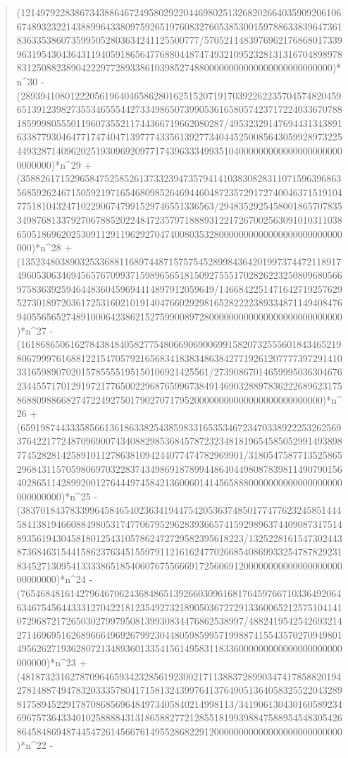 \documentclass[11pt,a4paper]{article}
\theoremstyle{plain}
\theoremstyle{definition}
\begin{document}
\begin{quote}
(121497922838673438864672495802922044698025132682026640359092061066748932322143889964338097592651976083276053853001597886338396473618363353860735995052803634241125500777/57052114839769621768680173399631954304364311940591865647768804487474932109523281313167048989788312508823890422297728933861039852748800000000000000000000000000)*n\^{}30 - (28939410801222056196404658628016251520719170392262235704574820459651391239827355346555442733498650739905361658057423717224033670788185999805550119607355211744366719662080287/495323291476944313438916338779304647717474047139777433561392773404452500856430599289732254493287140962025193096920977174396333499351040000000000000000000000000000)*n\^{}29 + (358826171529658475258526137332394735794141038308283110715963968635685926246715059219716546809852646944604872357291727400463715191047751810432471022906747991529746551336563/2948352925458001865707835349876813379270678852022484723579718889312217267002563091010311038650518696202530911291196292704740080353280000000000000000000000000000)*n\^{}28 + (135234803890325336881168974487157575452899843642019973744721189174960530634694565767099371598965651815092755517028262232508096805669758363925946448360459694414897912059649/1466842251471642719257629527301897203617253160210191404766029298165282222389334871149408476940556565274891000642386215275990089728000000000000000000000000000)*n\^{}27 - (16186865061627843848405827754806690690069915820732555601843465219806799976168812215470579216568341838348638427719261207777397291410331659890702015785555195150106921425561/2739086701465999503630467623445571701291972177650022968765996738491469032889783622268962317586880988668274722492750179027071795200000000000000000000000000)*n\^{}26 + (659198744333585661361863382543859833165353467234703389222532625693764221772487096900743408829853684578723234818196545850529914938987745282814258910112786381094244077474782969901/3180547587713525865296843115705980697032283743498691878994486404498087839811490790156402865114289920012764449745842136006014145658880000000000000000000000000000)*n\^{}25 - (383701843783399645846540236341944754205363748501774776232458514445841381946608849805317477067952962839366574159298963744090873175148935619430458180125431057862472729582395618223/132522816154730244387368463154415862376345155979112161624770266854086993325478782923183452713095413333865185406076755666917256069120000000000000000000000000000)*n\^{}24 - (765468481614279646706243684865139266030961681764597667103364920646346754564433312704221812354927321890503672729133600652125751041410729687217265030279979508139930834476862538997/4882419542542693214271469695162689666496926799230448059859957199887415543570270949801495626271936280721348936013354156149583118336000000000000000000000000000)*n\^{}23 + (4818732316278709646593423285619230021711388372899034741785882019427814887494783203335780417158132439976413764905136405832552204328981758945229178708685696484973405840214998113/341906130430160589234696757364334010258888431318658827721285518199398847588954548305426864584869487445472614566761495528682291200000000000000000000000000)*n\^{}22 - 
\end{quote}
\end{document}
